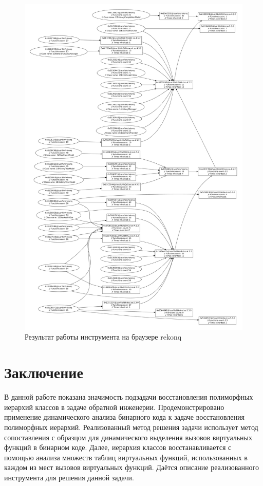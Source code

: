 \documentclass[a4paper,12pt,russian]{article}
\newcommand{\code}[1]{\textsf{#1}}
\begin{document}
\begin{figure}[b]
  \center
  \includegraphics[width=\textwidth]{rekonq-hier.pdf}
  \hfill
  \caption{Результат работы инструмента на браузере \code{rekonq}}
  \label{rekonq_res_fig}
\end{figure}

\clearpage
\newpage
\section{Заключение}
В данной работе показана значимость подзадачи восстановления полиморфных иерархий классов в задаче обратной инженерии.
Продемонстрировано применение динамического анализа бинарного кода к задаче восстановления полиморфных иерархий.
Реализованный метод решения задачи использует метод сопоставления с образцом для динамического выделения вызовов виртуальных функций в бинарном коде.
Далее, иерархия классов восстанавливается с помощью анализа множеств таблиц виртуальных функций, использованных в каждом из мест вызовов виртуальных функций.
Даётся описание реализованного инструмента для решения данной задачи.
\end{document}
